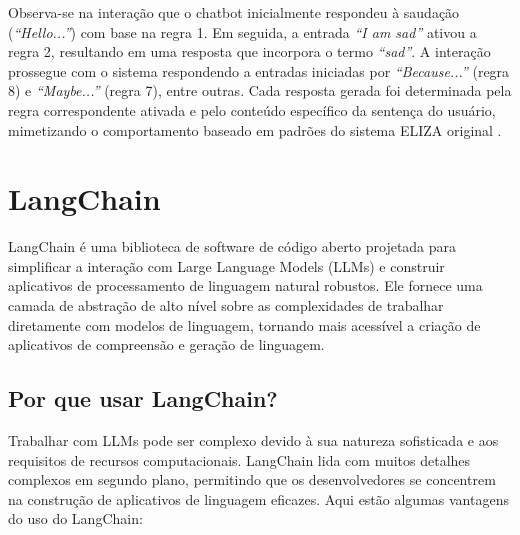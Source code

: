 \documentclass[a4paper,oneside]{book}
\begin{document}
Observa-se na interação que o chatbot inicialmente respondeu à saudação (\textit{``Hello...''}) com base na regra 1. Em seguida, a entrada \textit{``I am sad''} ativou a regra 2, resultando em uma resposta que incorpora o termo \textit{``sad''}. A interação prossegue com o sistema respondendo a entradas iniciadas por \textit{``Because...''} (regra 8) e \textit{``Maybe...''} (regra 7), entre outras. Cada resposta gerada foi determinada pela regra correspondente ativada e pelo conteúdo específico da sentença do usuário, mimetizando o comportamento baseado em padrões do sistema ELIZA original \cite{Abdul-Kader2015}.


\chapter{LangChain}

LangChain é uma biblioteca de software de código aberto projetada para simplificar a interação com Large Language Models (LLMs) e construir aplicativos de processamento de linguagem natural robustos. Ele fornece uma camada de abstração de alto nível sobre as complexidades de trabalhar diretamente com modelos de linguagem, tornando mais acessível a criação de aplicativos de compreensão e geração de linguagem.

\section{Por que usar LangChain?}

Trabalhar com LLMs pode ser complexo devido à sua natureza sofisticada e aos requisitos de recursos computacionais. LangChain lida com muitos detalhes complexos em segundo plano, permitindo que os desenvolvedores se concentrem na construção de aplicativos de linguagem eficazes. Aqui estão algumas vantagens do uso do LangChain:
\end{document}
